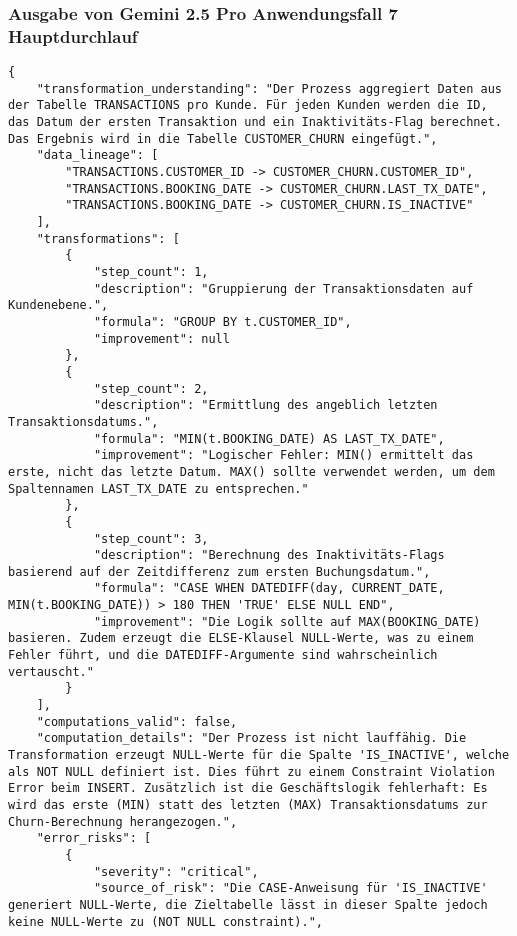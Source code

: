 \subsubsection{Ausgabe von Gemini 2.5 Pro Anwendungsfall 7 Hauptdurchlauf}\label{anhang:subsubsec:gemini_case7_prompt1}
\begin{lstlisting}[caption={Ausgabe: Gemini 2.5 Pro Anwendungsfall 7 Hauptdurchlauf},label={gemini_case7_prompt1}]
{
    "transformation_understanding": "Der Prozess aggregiert Daten aus der Tabelle TRANSACTIONS pro Kunde. Für jeden Kunden werden die ID, das Datum der ersten Transaktion und ein Inaktivitäts-Flag berechnet. Das Ergebnis wird in die Tabelle CUSTOMER_CHURN eingefügt.",
    "data_lineage": [
        "TRANSACTIONS.CUSTOMER_ID -> CUSTOMER_CHURN.CUSTOMER_ID",
        "TRANSACTIONS.BOOKING_DATE -> CUSTOMER_CHURN.LAST_TX_DATE",
        "TRANSACTIONS.BOOKING_DATE -> CUSTOMER_CHURN.IS_INACTIVE"
    ],
    "transformations": [
        {
            "step_count": 1,
            "description": "Gruppierung der Transaktionsdaten auf Kundenebene.",
            "formula": "GROUP BY t.CUSTOMER_ID",
            "improvement": null
        },
        {
            "step_count": 2,
            "description": "Ermittlung des angeblich letzten Transaktionsdatums.",
            "formula": "MIN(t.BOOKING_DATE) AS LAST_TX_DATE",
            "improvement": "Logischer Fehler: MIN() ermittelt das erste, nicht das letzte Datum. MAX() sollte verwendet werden, um dem Spaltennamen LAST_TX_DATE zu entsprechen."
        },
        {
            "step_count": 3,
            "description": "Berechnung des Inaktivitäts-Flags basierend auf der Zeitdifferenz zum ersten Buchungsdatum.",
            "formula": "CASE WHEN DATEDIFF(day, CURRENT_DATE, MIN(t.BOOKING_DATE)) > 180 THEN 'TRUE' ELSE NULL END",
            "improvement": "Die Logik sollte auf MAX(BOOKING_DATE) basieren. Zudem erzeugt die ELSE-Klausel NULL-Werte, was zu einem Fehler führt, und die DATEDIFF-Argumente sind wahrscheinlich vertauscht."
        }
    ],
    "computations_valid": false,
    "computation_details": "Der Prozess ist nicht lauffähig. Die Transformation erzeugt NULL-Werte für die Spalte 'IS_INACTIVE', welche als NOT NULL definiert ist. Dies führt zu einem Constraint Violation Error beim INSERT. Zusätzlich ist die Geschäftslogik fehlerhaft: Es wird das erste (MIN) statt des letzten (MAX) Transaktionsdatums zur Churn-Berechnung herangezogen.",
    "error_risks": [
        {
            "severity": "critical",
            "source_of_risk": "Die CASE-Anweisung für 'IS_INACTIVE' generiert NULL-Werte, die Zieltabelle lässt in dieser Spalte jedoch keine NULL-Werte zu (NOT NULL constraint).",

\end{lstlisting}

